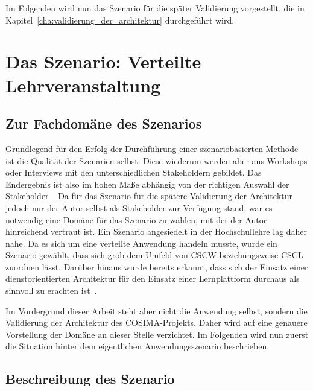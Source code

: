  
  Im Folgenden wird nun das Szenario für die später Validierung vorgestellt, die in Kapitel~\ref{cha:validierung_der_architektur} durchgeführt wird.
  

\section{Das Szenario: Verteilte Lehrveranstaltung} %
\label{sec:hochschulszenario}

\subsection{Zur Fachdomäne des Szenarios} %
\label{sub:zur_fachdomaene_des_szenarios}

  Grundlegend für den Erfolg der Durchführung einer szenariobasierten Methode ist die Qualität der Szenarien selbst. Diese wiederum werden aber aus Workshops oder Interviews mit den unterschiedlichen Stakeholdern gebildet. Das Endergebnis ist also im hohen Maße abhängig von der richtigen Auswahl der Stakeholder~\citep[S. 187]{evaluating_software_architectures}. Da für das Szenario für die spätere Validierung der Architektur jedoch nur der Autor selbst als Stakeholder zur Verfügung stand, war es notwendig eine Domäne für das Szenario zu wählen, mit der der Autor hinreichend vertraut ist. Ein Szenario angesiedelt in der Hochschullehre lag daher nahe. Da es sich um eine verteilte Anwendung handeln musste, wurde ein Szenario gewählt, dass sich grob dem Umfeld von CSCW beziehungsweise CSCL zuordnen lässt. Darüber hinaus wurde bereits erkannt, dass sich der Einsatz einer dienstorientierten Architektur für den Einsatz einer Lernplattform durchaus als sinnvoll zu erachten ist~\citep{campus_source}.
  
  Im Vordergrund dieser Arbeit steht aber nicht die Anwendung selbst, sondern die Validierung der Architektur des COSIMA-Projekts. Daher wird auf eine genauere Vorstellung der Domäne an dieser Stelle verzichtet. Im Folgenden wird nun zuerst die Situation hinter dem eigentlichen Anwendungsszenario beschrieben.


\subsection{Beschreibung des Szenario} %
\label{sub:beschreibung_des_szenario}

